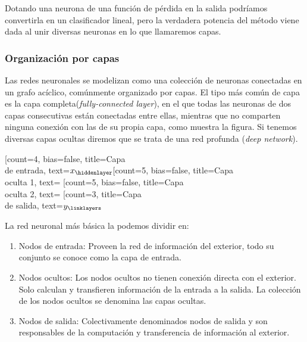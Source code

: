 \documentclass[12,twoside]{TFG-GM}
\theoremstyle{definition}
\theoremstyle{remark}
\begin{document}
%

Dotando una neurona de una función de pérdida en la salida podríamos convertirla en un clasificador lineal, pero la verdadera potencia del método viene dada al unir diversas neuronas en lo que llamaremos capas.

\subsubsection{Organización por capas}
Las redes neuronales se modelizan como una colección de neuronas conectadas en un grafo acíclico, comúnmente organizado por capas. El tipo más común de capa es la capa completa(\textit{fully-connected layer}), en el que todas las neuronas de dos capas consecutivas están conectadas entre ellas, mientras que no comparten ninguna conexión con las de su propia capa, como muestra la figura. Si tenemos diversas capas ocultas diremos que se trata de una red profunda (\textit{deep network}).

\begin{center}
\begin{neuralnetwork}[height=4]
		\newcommand{\nodetextclear}[2]{}
		\newcommand{\nodetextx}[2]{$x_#2$}
		\newcommand{\nodetexty}[2]{$y_#2$}
		[count=4, bias=false, title=Capa \\de entrada, text=\nodetextx]
		\hiddenlayer[count=5, bias=false, title=Capa \\ oculta 1, text=\nodetextclear] \linklayers
		\hiddenlayer[count=5, bias=false, title=Capa \\ oculta 2, text=\nodetextclear] \linklayers
		\outputlayer[count=3, title=Capa\\ de salida, text=\nodetexty] \linklayers
	\end{neuralnetwork}
\end{center}
La red neuronal más básica la podemos dividir en: 
\begin{enumerate}
\item Nodos de entrada: Proveen la red de información del exterior, todo su conjunto se conoce como la capa de entrada. 
\item Nodos ocultos: Los nodos ocultos no tienen conexión directa con el exterior. Solo calculan y transfieren información de la entrada a la salida. La colección de los nodos ocultos se denomina las capas ocultas.
\item Nodos de salida: Colectivamente denominados nodos de salida y son responsables de la computación y transferencia de información al exterior. 
\end{enumerate}
\end{document}
